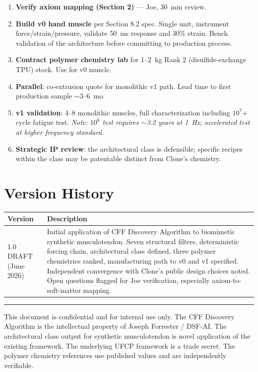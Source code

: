 \documentclass[11pt, a4paper]{article}
\begin{document}
\begin{enumerate}[nosep]
  \item \textbf{Verify axiom mapping (Section 2)} --- Joe, 30~min
        review.
  \item \textbf{Build v0 hand muscle} per Section 8.2 spec.
        Single unit, instrument force/strain/pressure, validate
        50~ms response and 30\% strain. Bench validation of the
        architecture before committing to production process.
  \item \textbf{Contract polymer chemistry lab} for 1--2~kg
        Rank 2 (disulfide-exchange TPU) stock. Use for v0 muscle.
  \item \textbf{Parallel}: co-extrusion quote for monolithic v1
        path. Lead time to first production sample $\sim$3--6~mo.
  \item \textbf{v1 validation}: 4--8 monolithic muscles, full
        characterization including $10^7$+ cycle fatigue test.
        \textit{Note: $10^8$ test requires $\sim$3.2 years at 1~Hz;
        accelerated test at higher frequency standard.}
  \item \textbf{Strategic IP review}: the architectural class is
        defensible; specific recipes within the class may be
        patentable distinct from Clone's chemistry.
\end{enumerate}

\section{Version History}

\begin{center}
\begin{tabular}{@{}lp{10.5cm}@{}}
\toprule
\textbf{Version} & \textbf{Description} \\
\midrule
1.0 DRAFT (June 2026) & Initial application of CFF Discovery
  Algorithm to biomimetic synthetic musculotendon. Seven structural
  filters, deterministic forcing chain, architectural class
  defined, three polymer chemistries ranked, manufacturing path
  to v0 and v1 specified. Independent convergence with Clone's
  public design choices noted. Open questions flagged for Joe
  verification, especially axiom-to-soft-matter mapping. \\
\bottomrule
\end{tabular}
\end{center}

\vspace{2em}
\hrule
\vspace{0.5em}
{\color{nm-gray}\small This document is confidential and for
internal use only. The CFF Discovery Algorithm is the intellectual
property of Joseph Forrester / DSF-AI. The architectural class
output for synthetic musculotendon is novel application of the
existing framework. The underlying UFCP framework is a trade
secret. The polymer chemistry references use published values
and are independently verifiable.}
\end{document}
